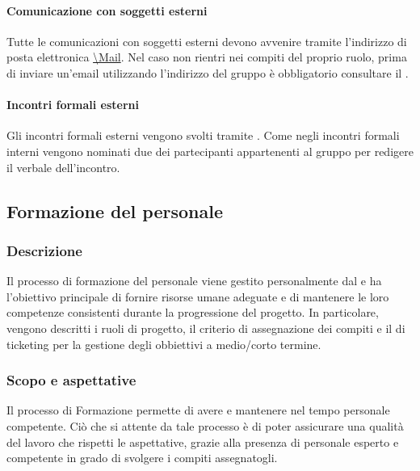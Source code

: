 \paragraph*{Comunicazione con soggetti esterni}
Tutte le comunicazioni con soggetti esterni devono avvenire tramite l'indirizzo di posta elettronica \url{\Mail}. Nel caso non rientri nei compiti del proprio ruolo, prima di inviare un'email utilizzando l'indirizzo del gruppo è obbligatorio consultare il \RdP{}.
\paragraph*{Incontri formali esterni}
Gli incontri formali esterni vengono svolti tramite . Come negli incontri formali interni vengono nominati due dei partecipanti appartenenti al gruppo per redigere il verbale dell'incontro. 



\subsection{Formazione del personale}
\subsubsection{Descrizione}
Il processo di formazione del personale viene gestito personalmente dal \RdP{} e ha l'obiettivo principale di fornire risorse umane adeguate e di mantenere le loro competenze consistenti durante la progressione del progetto. In particolare, vengono descritti i ruoli di progetto, il criterio di assegnazione dei compiti e il  di ticketing per la gestione degli obbiettivi a medio/corto termine.
\subsubsection{Scopo e aspettative}
Il processo di Formazione permette di avere e mantenere nel tempo personale competente. Ciò che si attente da tale processo è di poter assicurare una qualità del lavoro che rispetti le aspettative, grazie alla presenza di personale esperto e competente in grado di svolgere i compiti assegnatogli.
